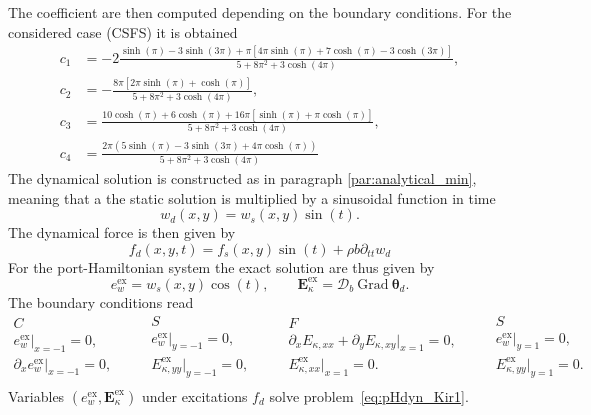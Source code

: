 The coefficient are then computed depending on the boundary conditions. For the considered case (CSFS) it is obtained
\begin{align*}
c_1 &= -2 \frac{\sinh(\pi) - 3 \sinh(3\pi) + \pi[4\pi\sinh(\pi)+7\cosh(\pi) - 3\cosh(3 \pi)]}{5 + 8\pi^2 + 3\cosh(4\pi)}, \\
c_2 &= - \frac{8\pi[2\pi\sinh(\pi) + \cosh(\pi)]}{5 + 8\pi^2 + 3\cosh(4\pi)}, \\
c_3 &= \frac{10\cosh(\pi) + 6\cosh(\pi) + 16\pi[\sinh(\pi) + \pi\cosh(\pi)]}{5 + 8 \pi^2 + 3\cosh(4\pi)}, \\
c_4 &= \frac{2\pi(5\sinh(\pi) - 3\sinh(3\pi) + 4\pi\cosh(\pi))}{5 + 8\pi^2 + 3\cosh(4\pi)}
\end{align*}
The dynamical solution is constructed as in paragraph \ref{par:analytical_min}, meaning that a the static solution is multiplied by a sinusoidal function in time
\begin{equation*}
w_d(x, y) = w_s(x, y) \sin(t).
\end{equation*}
The dynamical force is then given by
\begin{equation*}
f_d(x,y,t) = f_s(x,y)\sin(t) +  \rho b \partial_{tt} w_d
\end{equation*}
For the port-Hamiltonian system the exact solution  are thus given by
\begin{equation}
e_w^\text{ex} = w_s(x,y) \cos(t), \qquad \bm{E}_\kappa^\text{ex} =  \bm{\mathcal{D}}_b \ \mathrm{Grad} \ \bm{\theta}_d.
\end{equation}
The boundary conditions read
\begin{equation}
\begin{aligned}
C \\
e_w^\text{ex}\vert_{x=-1} = 0, \\
\partial_{x} e_w^\text{ex}\vert_{x=-1} = 0, \\
\end{aligned} \qquad
\begin{aligned}
S \\
e_w^\text{ex}\vert_{y=-1} = 0, \\
{E}_{\kappa, yy}^\text{ex}\vert_{y=-1} =  0, \\
\end{aligned} \qquad
\begin{aligned}
F \\
\partial_x {E}_{\kappa, xx} + \partial_y {E}_{\kappa, xy}\vert_{x=1} = 0, \\
{E}_{\kappa, xx}^\text{ex}\vert_{x=1} =  0. \\
\end{aligned} \qquad
\begin{aligned}
S \\
e_w^\text{ex}\vert_{y=1} = 0, \\
{E}_{\kappa, yy}^\text{ex}\vert_{y=1} =  0. \\
\end{aligned} 
\end{equation}
Variables $(e_w^\text{ex}, \bm{E}_\kappa^\text{ex})$ under excitations $f_d$ solve problem~\eqref{eq:pHdyn_Kir1}. 

